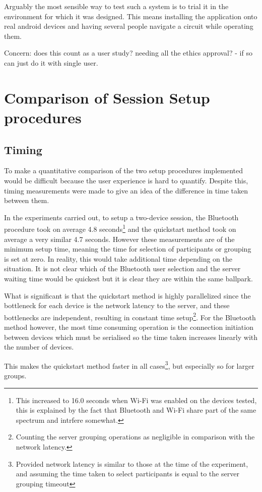 Arguably the most sensible way to test such a system is to trial it in the environment for which it was designed. This means installing the application onto real android devices and having several people navigate a circuit while operating them.

Concern: does this count as a user study? needing all the ethics approval? - if so can just do it with single user.

\section{Comparison of Session Setup procedures}

\subsection{Timing}
\label{setupEval}
To make a quantitative comparison of the two setup procedures implemented would be difficult because the user experience is hard to quantify. Despite this, timing measurements were made to give an idea of the difference in time taken between them.

In the experiments carried out, to setup a two-device session, the Bluetooth procedure took on average 4.8 seconds\footnote{This increased to 16.0 seconds when Wi-Fi was enabled on the devices tested, this is explained by the fact that Bluetooth and Wi-Fi share part of the same spectrum and intrfere somewhat.\cite{btWi-Fi}} and the quickstart method took on average a very similar 4.7 seconds. However these measurements are of the minimum setup time, meaning the time for selection of participants or grouping is set at zero. In reality, this would take additional time depending on the situation. It is not clear which of the Bluetooth user selection and the server waiting time would be quickest but it is clear they are within the same ballpark.

What is significant is that the quickstart method is highly parallelized since the bottleneck for each device is the network latency to the server, and these bottlenecks are independent, resulting in constant time setup\footnote{Counting the server grouping operations as negligible in comparison with the network latency.}. For the Bluetooth method however, the most time consuming operation is the connection initiation between devices which must be serialised so the time taken increases linearly with the number of devices.

This makes the quickstart method faster in all cases\footnote{Provided network latency is similar to those at the time of the experiment, and assuming the time taken to select participants is equal to the server grouping timeout}, but especially so for larger groups.


